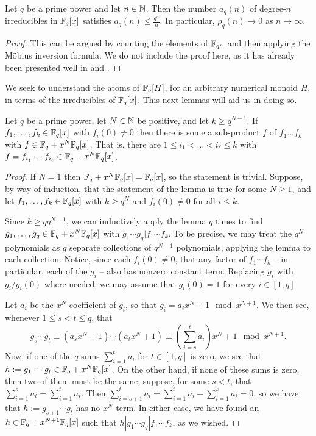 \begin{prop}\label{prop:atoms in Fqx}
	Let $q$ be a prime power and let $n\in \mathbb{N}$.
	Then the number $a_q(n)$ of degree-$n$ irreducibles in $\mathbb{F}_q[x]$ satisfies $a_q(n) \le \frac{q^n}{n}$.
	In particular, $\rho_q(n) \to 0$ as $n\to\infty$.
\end{prop}

\begin{proof}
	This can be argued by counting the elements of $\mathbb{F}_{q^n}$ and then applying the M\"{o}bius inversion formula.
	We do not include the proof here, as it has already been presented well in \cite[Section 14.3]{dummit-foote91} and \cite[Section 2.3]{lidl-niederreiter97}.
\end{proof}

We seek to understand the atoms of $\mathbb{F}_q[H]$, for an arbitrary numerical monoid $H$, in terms of the irreducibles of $\mathbb{F}_q[x]$.
This next lemmas will aid us in doing so.

\begin{lemma}\label{lem:coefficient gap boosting}
	Let $q$ be a prime power, let $N\in\mathbb{N}$ be positive, and let $k \ge q^{N-1}$.
	If $f_1,\dots,f_k\in \mathbb{F}_q[x]$ with $f_i(0)\neq 0$ then there is some a sub-product $f$ of $f_1\dots f_k$ with $f\in \mathbb{F}_q + x^N \mathbb{F}_q[x]$.
	That is, there are $1\le i_1 < \dots < i_\ell \le k$ with $f = f_{i_1}\cdots f_{i_\ell} \in \mathbb{F}_q + x^N \mathbb{F}_q[x]$.
\end{lemma}

\begin{proof}
	If $N=1$ then $\mathbb{F}_q + x^N\mathbb{F}_q[x] = \mathbb{F}_q[x]$, so the statement is trivial.
	Suppose, by way of induction, that the statement of the lemma is true for some $N\ge 1$, and let $f_1,\dots, f_k\in \mathbb{F}_q[x]$ with $k \ge q^N$ and $f_i(0)\neq0$ for all $i\le k$.
	
	Since $k \ge q q^{N-1}$, we can inductively apply the lemma $q$ times to find $g_1,\dots,g_q\in \mathbb{F}_q + x^N \mathbb{F}_q[x]$ with $g_1\cdots g_q | f_1\cdots f_k$.
	To be precise, we may treat the $q^N$ polynomials as $q$ separate collections of $q^{N-1}$ polynomials, applying the lemma to each collection.
	Notice, since each $f_i(0) \neq 0$, that any factor of $f_1\cdots f_k$ -- in particular, each of the $g_i$ -- also has nonzero constant term.
	Replacing $g_i$ with $g_i/g_i(0)$ where needed, we may assume that $g_i(0)=1$ for every $i\in [1,q]$
	
	Let $a_i$ be the $x^N$ coefficient of $g_i$, so that $g_i = a_i x^N + 1 \mod {x^{N+1}}$.
	We then see, whenever $1\le s<t\le q$, that
	\[ g_s\cdots g_t \equiv (a_s x^N + 1)\cdots(a_t x^N + 1) \equiv \left(\sum_{i=s}^t a_i\right) x^N + 1 \mod {x^{N+1}}. \]
	Now, if one of the $q$ sums $\sum_{i=1}^t a_i$ for $t\in [1,q]$ is zero, we see that $h := g_1\cdots g_t \in \mathbb{F}_q + x^N\mathbb{F}_q[x]$.
	On the other hand, if none of these sums is zero, then two of them must be the same; suppose, for some $s<t$, that $\sum_{i=1}^s a_i = \sum_{i=1}^t a_i$.
	Then $\sum_{i=s+1}^ta_i = \sum_{i=1}^t a_i - \sum_{i=1}^s a_i = 0$, so we have that $h := g_{s+1}\cdots g_t$ has no $x^N$ term.
	In either case, we have found an $h\in \mathbb{F}_q + x^{N+1}\mathbb{F}_q[x]$ such that $h | g_1\cdots g_q | f_1\cdots f_k$, as we wished.
\end{proof}

